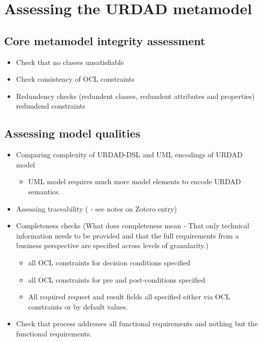 \section{Assessing the URDAD metamodel \label{sec:metamodelAssessment}}




\subsection{Core metamodel integrity assessment}


\begin{itemize}
  \item Check that no classes unsatisfiable
  \item Check consistency of OCL constraints
  \item Redundency checks (redundent classes, redundent attributes and properties) redundend constraints
\end{itemize}


\subsection{Assessing model qualities}

\begin{itemize}
  \item Comparing complexity of URDAD-DSL and UML encodings of URDAD model
    \begin{itemize}
     \item UML model requires much more model elements to encode URDAD semantics.
    \end{itemize}
  \item Assessing traceability (\cite{dick_design_2005} - see notes on Zotero entry)
  \item Completeness checks
(What does completeness mean - That only technical information needs to be provided and that the full requirements
from a business perspective are specified across levels of granularity.)
    \begin{itemize}
     \item all OCL constraints for decision conditions specified
     \item all OCL constraints for pre and post-conditions specified
     \item All required request and result fields all specified either via OCL constraints 
	or by default values.
    \end{itemize}
  \item Check that process addresses all functional requirements and nothing but the functional requirements.
  
\end{itemize}

